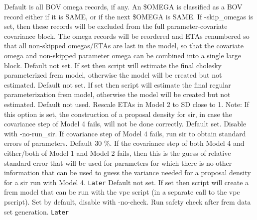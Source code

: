 \begin{optionlist}
{}
Default is all BOV omega records, if any.
An \$OMEGA is classified as a BOV record either if it is SAME, or if the next \$OMEGA is SAME. 
If -skip\_omegas is set,
then these records will be excluded from the full parameter-covariate covariance block.
The omega records will be reordered and ETAs renumbered so that all non-skipped
omegas/ETAs are last in the model, so that the covariate omega and non-skipped parameter omega
can be combined into a single large block.
\nextopt
{}
Default not set.
If set then script will estimate
the final cholesky parameterized frem model, otherwise the model will be
created but not estimated.
\nextopt
{}
Default not set.
If set then script will estimate
the final regular parameterization frem model, otherwise the model will be
created but not estimated.
\nextopt
{}
Default not used. Rescale ETAs in Model 2 to SD close to 1.
Note: If this option is set, the construction of a proposal density for sir,
in case the covariance step of Model 4 fails, will not be done correctly.
\nextopt
{}
Default set. Disable with -no-run\_sir. If covariance step of Model 4 fails, run sir
to obtain standard errors of parameters.
\nextopt
{}
Default 30 \%.
If the covariance step of both Model 4 and either/both of Model 1 and Model 2 fails, then
this is the guess of relative standard error that will be used for parameters for which there is no other
information that can be used to guess the variance needed for 
a proposal density for a sir run with Model 4.
\nextopt
{}
{\Large \texttt{Later}}
Default not set. If set then script will create a frem model that can be run with the vpc script (in a separate call to the vpc pscript).  
\nextopt
{}
Set by default, disable with -no-check. Run safety check after frem data set generation. 
\nextopt
{}
{\Large \texttt{Later}}

\end{optionlist}
